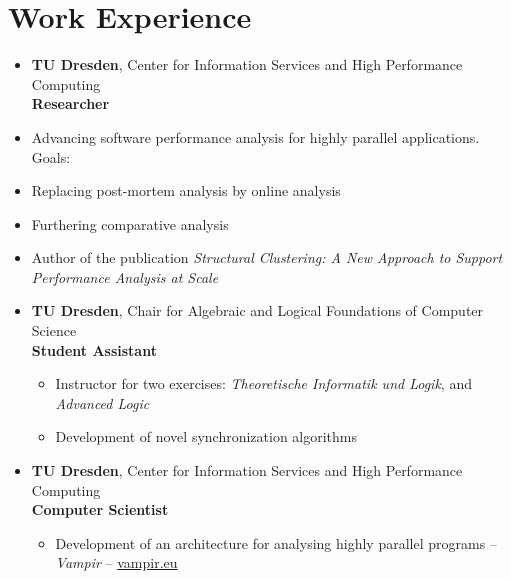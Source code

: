 



\pagestyle{empty}



\section*{Work Experience}
\begin{itemize}
	\item {}
		\textbf{TU Dresden}, Center for Information Services and High Performance Computing \\
		\textbf{Researcher}
		\item Advancing software performance analysis for highly parallel applications. Goals:
			\item \hspace{1em} Replacing post-mortem analysis by online analysis
			\item \hspace{1em} Furthering comparative analysis
		\item Author of the publication \emph{Structural Clustering: A New Approach to Support Performance Analysis at Scale}
	\item {}
		\textbf{TU Dresden}, Chair for Algebraic and Logical Foundations of Computer Science \\
		\textbf{Student Assistant}
		\begin{itemize}
			\item Instructor for two exercises: \textit{Theoretische Informatik und Logik}, and \textit{Advanced Logic}
			\item Development of novel synchronization algorithms
		\end{itemize}
	\item {}
		\textbf{TU Dresden}, Center for Information Services and High Performance Computing \\
		\textbf{Computer Scientist}
		\begin{itemize}
			\item Development of an architecture for analysing highly parallel programs -- \emph{Vampir} -- \href{http://www.vampir.eu}{vampir.eu}

\end{itemize}
\end{itemize}
